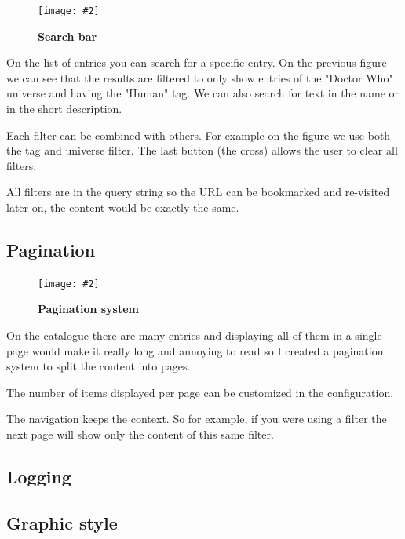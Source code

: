 \documentclass[10pt, a4paper]{article}
\newcommand{\figuremacro}[5]{
    \begin{figure}[#1]
        \centering
        \texttt{[image: \#2]}
        \caption[#3]{\textbf{#3}#4}
        \label{fig:#2}
    \end{figure}
}
\begin{document}
	\figuremacro{h}{SearchSystem}{Search bar}{}{0.6}
	
	On the list of entries you can search for a specific entry. On the previous figure we can see that the results are filtered to only show entries of the "Doctor Who" universe and having the "Human" tag. We can also search for text in the name or in the short description.
	
	Each filter can be combined with others. For example on the figure we use both the tag and universe filter. The last button (the cross) allows the user to clear all filters.
	
	All filters are in the query string so the URL can be bookmarked and re-visited later-on, the content would be exactly the same.
	
	\subsection{Pagination}
	
	\figuremacro{h}{Pagination}{Pagination system}{}{0.6}
	
	On the catalogue there are many entries and displaying all of them in a single page would make it really long and annoying to read so I created a pagination system to split the content into pages.
	
	The number of items displayed per page can be customized in the configuration.
	
	The navigation keeps the context. So for example, if you were using a filter the next page will show only the content of this same filter.
	
	\subsection{Logging}
	
	\subsection{Graphic style}
	
\end{document}
